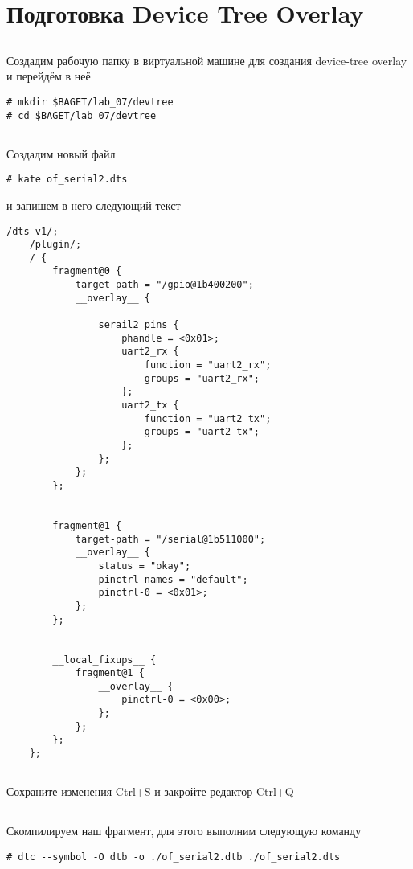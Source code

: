 \section{Подготовка Device Tree Overlay}

\subsection{} Создадим рабочую папку в виртуальной машине для создания device-tree overlay и перейдём в неё 
\begin{lstlisting}[style=bash]
# mkdir $BAGET/lab_07/devtree
# cd $BAGET/lab_07/devtree 
\end{lstlisting}

\subsection{}Создадим новый файл
\begin{lstlisting}[style=bash]
# kate of_serial2.dts
\end{lstlisting}
и запишем в него следующий текст
\begin{lstlisting}[style=stdout]
	/dts-v1/;
	/plugin/;
	/ {
		fragment@0 {
			target-path = "/gpio@1b400200";
			__overlay__ {
				
				serail2_pins {
					phandle = <0x01>;
					uart2_rx {
						function = "uart2_rx";
						groups = "uart2_rx";
					};
					uart2_tx {
						function = "uart2_tx";
						groups = "uart2_tx";
					};
				};
			};
		};
		
		
		fragment@1 { 
			target-path = "/serial@1b511000"; 
			__overlay__ { 
				status = "okay"; 
				pinctrl-names = "default"; 
				pinctrl-0 = <0x01>; 
			}; 
		}; 
		
		
		__local_fixups__ {
			fragment@1 {
				__overlay__ {
					pinctrl-0 = <0x00>;
				};
			};	
		};
	};
\end{lstlisting}

\subsection{}Сохраните изменения Ctrl+S и закройте редактор Ctrl+Q 

\subsection{}Скомпилируем наш фрагмент, для этого выполним следующую команду
\begin{lstlisting}[style=bash]
# dtc --symbol -O dtb -o ./of_serial2.dtb ./of_serial2.dts
\end{lstlisting}

